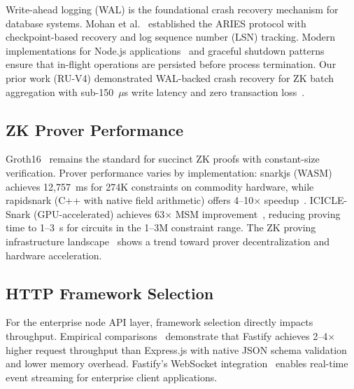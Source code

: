 Write-ahead logging (WAL) is the foundational crash recovery mechanism for
database systems. Mohan et al.~\cite{mohan1992aries} established the ARIES
protocol with checkpoint-based recovery and log sequence number (LSN)
tracking. Modern implementations for Node.js
applications~\cite{wal2024architecture} and graceful shutdown
patterns~\cite{nodejs2025shutdown} ensure that in-flight operations are
persisted before process termination. Our prior work (RU-V4) demonstrated
WAL-backed crash recovery for ZK batch aggregation with sub-150~$\mu$s
write latency and zero transaction loss~\cite{baylina2019smt}.

\subsection{ZK Prover Performance}

Groth16~\cite{groth2016size} remains the standard for succinct ZK proofs
with constant-size verification. Prover performance varies by implementation:
snarkjs (WASM)~\cite{snarkjs} achieves 12,757~ms for 274K constraints on
commodity hardware, while rapidsnark (C++ with native field arithmetic)
offers 4--10$\times$ speedup~\cite{mopro2025comparison}. ICICLE-Snark
(GPU-accelerated) achieves 63$\times$ MSM improvement~\cite{icicle2025snark},
reducing proving time to 1--3~s for circuits in the 1--3M constraint range.
The ZK proving infrastructure landscape~\cite{zkcloud2024landscape} shows a
trend toward prover decentralization and hardware acceleration.

\subsection{HTTP Framework Selection}

For the enterprise node API layer, framework selection directly impacts
throughput. Empirical comparisons~\cite{fastify2025comparison} demonstrate
that Fastify achieves 2--4$\times$ higher request throughput than Express.js
with native JSON schema validation and lower memory overhead. Fastify's
WebSocket integration~\cite{fastify2025websocket} enables real-time event
streaming for enterprise client applications.
